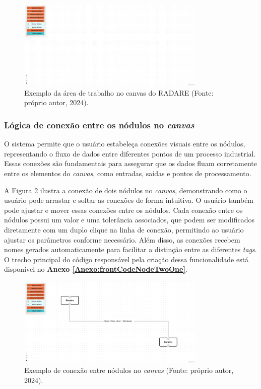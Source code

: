 \begin{figure}[htbp]
    \centering
    \includegraphics[width=0.8\textwidth]{figuras/empty-canvas.png}
    \caption{Exemplo da área de trabalho no canvas do RADARE (Fonte: próprio autor, 2024).}
    \label{Fig:EmptyCanvas}
\end{figure}

\subsubsection{Lógica de conexão entre os nódulos no \textit{canvas}}

O sistema permite que o usuário estabeleça conexões visuais entre os nódulos, representando o fluxo de dados entre diferentes pontos de um processo industrial. Essas conexões são fundamentais para assegurar que os dados fluam corretamente entre os elementos do \textit{canvas}, como entradas, saídas e pontos de processamento.

A Figura \ref{Fig:NodeConnections} ilustra a conexão de dois nódulos no \textit{canvas}, demonstrando como o usuário pode arrastar e soltar as conexões de forma intuitiva. O usuário também pode ajustar e mover essas conexões entre os nódulos. Cada conexão entre os nódulos possui um valor e uma tolerância associados, que podem ser modificados diretamente com um duplo clique na linha de conexão, permitindo ao usuário ajustar os parâmetros conforme necessário. Além disso, as conexões recebem nomes gerados automaticamente para facilitar a distinção entre as diferentes \textit{tags}. O trecho principal do código responsável pela criação dessa funcionalidade está disponível no \textbf{Anexo \ref{Anexo:frontCodeNodeTwoOne}}.

\begin{figure}[htbp]
    \centering
    \includegraphics[width=0.8\textwidth]{figuras/node-connection-example.png}
    \caption{Exemplo de conexão entre nódulos no \textit{canvas} (Fonte: próprio autor, 2024).}
    \label{Fig:NodeConnections}
\end{figure}

